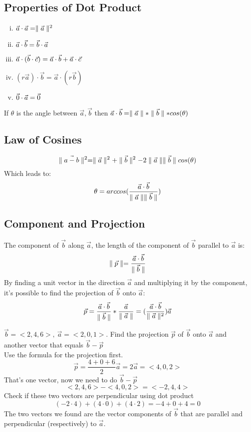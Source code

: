 \documentclass[12 pt]{article}
\begin{document}
		\subsection{Properties of Dot Product}

		\begin{enumerate}[i)]
			\item $\vec{a}\cdot\vec{a}=\parallel \vec{a} \parallel^2$
			\item $\vec{a}\cdot\vec{b}=\vec{b}\cdot\vec{a}$
			\item $\vec{a}\cdot (\vec{b}\cdot\vec{c})=\vec{a}\cdot\vec{b}+\vec{a}\cdot\vec{c}$
			\item $(r\vec{a})\cdot\vec{b}=\vec{a}\cdot(r\vec{b})$
			\item $\vec{0}\cdot\vec{a}=\vec{0}$
		\end{enumerate}
		\begin{thrm}
			If $\theta$ is the angle between $\vec{a},\vec{b}$ then $\vec{a}\cdot\vec{b}=\parallel\vec{a}\parallel*\parallel\vec{b}\parallel *cos(\theta)$
		\end{thrm}

		\subsection{Law of Cosines}

		$$\parallel \vec{a-b} \parallel^2=\parallel \vec{a} \parallel^2+\parallel \vec{b} \parallel^2-2\parallel \vec{a} \parallel\parallel \vec{b} \parallel cos(\theta)$$
		Which leads to:\\
		$$\theta=arccos(\frac{\vec{a}\cdot\vec{b}}{\parallel \vec{a} \parallel\parallel \vec{b} \parallel})$$

		\subsection{Component and Projection}

		The component of $\vec{b}$ along $\vec{a}$, the length of the component of $\vec{b}$ parallel to $\vec{a}$ is:
		$$\parallel \vec{p} \parallel=\frac{\vec{a}\cdot\vec{b}}{\parallel \vec{b} \parallel}$$
		By finding a unit vector in the direction $\vec{a}$ and multiplying it by the component, it's possible to find the projection of $\vec{b}$ onto $\vec{a}$:
		$$\vec{p}=\frac{\vec{a}\cdot\vec{b}}{\parallel \vec{b} \parallel}*\frac{\vec{a}}{\parallel \vec{a} \parallel}=(\frac{\vec{a}\cdot\vec{b}}{\parallel \vec{a} \parallel^2})\vec{a}$$

		\begin{exmp*}
			$\vec{b}=<2,4,6>,\ \vec{a}=<2,0,1>$. Find the projection $\vec{p}$ of $\vec{b}$ onto $\vec{a}$ and another vector that equals $\vec{b}-\vec{p}$\\
			Use the formula for the projection first.
			$$\vec{p}=\frac{4+0+6}{2}\vec{a}=2\vec{a}=<4,0,2>$$
			That's one vector, now we need to do $\vec{b}-\vec{p}$
			$$<2,4,6>-<4,0,2>=<-2,4,4>$$
			Check if these two vectors are perpendicular using dot product
			$$(-2\cdot 4)+(4\cdot 0)+(4\cdot 2)=-4+0+4=0$$
			The two vectors we found are the vector components of $\vec{b}$ that are parallel and perpendicular (respectively) to $\vec{a}$.
		\end{exmp*}
\end{document}
